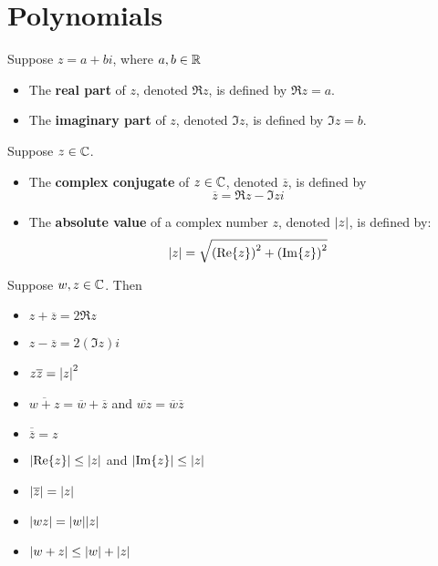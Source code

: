 
\section{Polynomials}

\begin{definition}[$\Re{z}, \Im{z}$]
	Suppose $z = a + bi$, where $a, b \in \operatorname{\mathbb{R}}$
	\begin{itemize} 
		\item The \textbf{real part} of $z$, denoted $\Re{z}$, is defined by $\Re{z} = a$.
		\item The \textbf{imaginary part} of $z$, denoted $\Im{z}$, is defined by $\Im{z} = b$.
	\end{itemize}
\end{definition}

\begin{definition}
    Suppose $z \in \operatorname{\mathbb{C}}$.
    \begin{itemize}
        \item The \textbf{complex conjugate} of $z \in \operatorname{\mathbb{C}}$, denoted $\overline{z}$, is defined by
        \[ \overline{z} = \Re{z} - \Im{z}i \]
        \item The \textbf{absolute value} of a complex number $z$, denoted $\abs{z}$, is
        defined by:
        \[ \abs{z} = \sqrt{\qty(\Re{z})^2 + \qty(\Im{z})^2 } \]
    \end{itemize}
\end{definition}

\begin{theorem}
    Suppose $w, z \in \operatorname{\mathbb{C}}$. Then
    \begin{itemize}
        \item $z + \overline{z} = 2 \Re{z}$
        \item $z - \overline{z} = 2 (\Im z)i$
        \item $z \overline{z} = \abs{z}^2$
        \item $\overline{w + z} = \overline{w} + \overline{z}$ and $\overline{wz} = \overline{w} \overline{z}$
        \item $\overline{\overline{z}} = z$
        \item $\abs{\Re{z}} \leq \abs{z}$ and $\abs{\Im{z}} \leq \abs{z}$
        \item $\abs{\overline{z}} = \abs{z}$
        \item $\abs{wz} = \abs{w} \abs{z}$
        \item $\abs{w+z} \leq \abs{w} + \abs{z}$
    \end{itemize}
\end{theorem}

